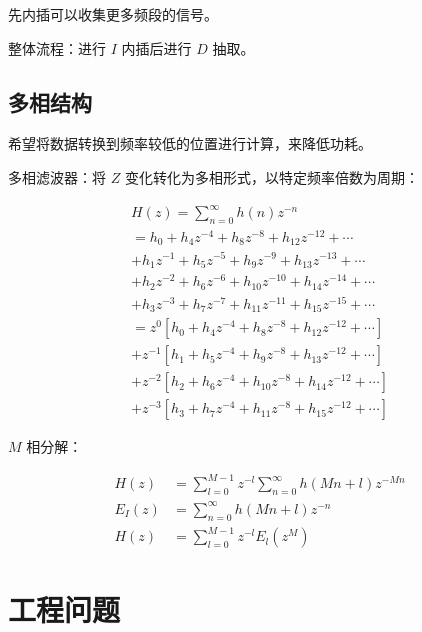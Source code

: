 \documentclass[cn,11pt,chinese,black,simple]{../elegantbook}
\begin{document}
先内插可以收集更多频段的信号。

整体流程：进行 \(I\) 内插后进行 \(D\) 抽取。

\subsection{多相结构}

希望将数据转换到频率较低的位置进行计算，来降低功耗。

多相滤波器：将 \(Z\) 变化转化为多相形式，以特定频率倍数为周期：

\[\begin{array}{l}
    H(z)=\sum_{n=0}^{\infty} h(n) z^{-n} \\
    =h_{0}+h_{4} z^{-4}+h_{8} z^{-8}+h_{12} z^{-12}+\cdots \\
    +h_{1} z^{-1}+h_{5} z^{-5}+h_{9} z^{-9}+h_{13} z^{-13}+\cdots \\
    +h_{2} z^{-2}+h_{6} z^{-6}+h_{10} z^{-10}+h_{14} z^{-14}+\cdots \\
    +h_{3} z^{-3}+h_{7} z^{-7}+h_{11} z^{-11}+h_{15} z^{-15}+\cdots \\
    =z^{0}\left[h_{0}+h_{4} z^{-4}+h_{8} z^{-8}+h_{12} z^{-12}+\cdots\right] \\
    +z^{-1}\left[h_{1}+h_{5} z^{-4}+h_{9} z^{-8}+h_{13} z^{-12}+\cdots\right] \\
    +z^{-2}\left[h_{2}+h_{6} z^{-4}+h_{10} z^{-8}+h_{14} z^{-12}+\cdots\right] \\
    +z^{-3}\left[h_{3}+h_{7} z^{-4}+h_{11} z^{-8}+h_{15} z^{-12}+\cdots\right]
\end{array}\]

\(M\) 相分解：

\[\begin{aligned}
    H(z) &=\sum_{l=0}^{M-1} z^{-l} \sum_{n=0}^{\infty} h(M n+l) z^{-M n} \\
    E_{I}(z) &=\sum_{n=0}^{\infty} h(M n+l) z^{-n} \\
    H(z) &=\sum_{l=0}^{M-1} z^{-l} E_{l}\left(z^{M}\right)
\end{aligned}\]


\section{工程问题}



\let\chapname\undefined
\ifx\mainclass\undefined
\end{document}
